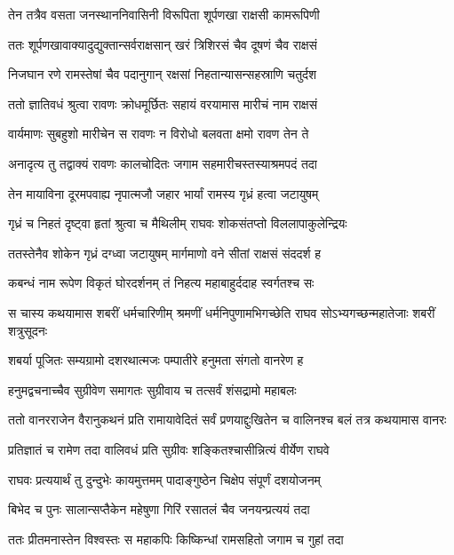 \twolineshloka
{तेन तत्रैव वसता जनस्थाननिवासिनी}
{विरूपिता शूर्पणखा राक्षसी कामरूपिणी} %

\twolineshloka
{ततः शूर्पणखावाक्यादुद्युक्तान्सर्वराक्षसान्}
{खरं त्रिशिरसं चैव दूषणं चैव राक्षसं} %

\twolineshloka
{निजघान रणे रामस्तेषां चैव पदानुगान्}
{रक्षसां निहतान्यासन्सहस्राणि चतुर्दश} %

\twolineshloka
{ततो ज्ञातिवधं श्रुत्वा रावणः क्रोधमूर्छितः}
{सहायं वरयामास मारीचं नाम राक्षसं} %

\twolineshloka
{वार्यमाणः सुबहुशो मारीचेन स रावणः}
{न विरोधो बलवता क्षमो रावण तेन ते} %

\twolineshloka
{अनादृत्य तु तद्वाक्यं रावणः कालचोदितः}
{जगाम सहमारीचस्तस्याश्रमपदं तदा} %

\twolineshloka
{तेन मायाविना दूरमपवाह्य नृपात्मजौ}
{जहार भार्यां रामस्य गृध्रं हत्वा जटायुषम्} %

\twolineshloka
{गृध्रं च निहतं दृष्ट्वा हृतां श्रुत्वा च मैथिलीम्}
{राघवः शोकसंतप्तो विललापाकुलेन्द्रियः} %

\twolineshloka
{ततस्तेनैव शोकेन गृध्रं दग्ध्वा जटायुषम्}
{मार्गमाणो वने सीतां राक्षसं संददर्श ह} %

\twolineshloka
{कबन्धं नाम रूपेण विकृतं घोरदर्शनम्}
{तं निहत्य महाबाहुर्ददाह स्वर्गतश्च सः} %

\threelineshloka
{स चास्य कथयामास शबरीं धर्मचारिणीम्}
{श्रमणीं धर्मनिपुणामभिगच्छेति राघव}
{सोऽभ्यगच्छन्महातेजाः शबरीं शत्रुसूदनः} %

\twolineshloka
{शबर्या पूजितः सम्यग्रामो दशरथात्मजः}
{पम्पातीरे हनुमता संगतो वानरेण ह} %

\twolineshloka
{हनुमद्वचनाच्चैव सुग्रीवेण समागतः}
{सुग्रीवाय च तत्सर्वं शंसद्रामो महाबलः} %

\threelineshloka
{ततो वानरराजेन वैरानुकथनं प्रति}
{रामायावेदितं सर्वं प्रणयाद्दुःखितेन च}
{वालिनश्च बलं तत्र कथयामास वानरः} %

\twolineshloka
{प्रतिज्ञातं च रामेण तदा वालिवधं प्रति}
{सुग्रीवः शङ्कितश्चासीन्नित्यं वीर्येण राघवे} %

\twolineshloka
{राघवः प्रत्ययार्थं तु दुन्दुभेः कायमुत्तमम्}
{पादाङ्गुष्ठेन चिक्षेप संपूर्णं दशयोजनम्} %

\twolineshloka
{बिभेद च पुनः सालान्सप्तैकेन महेषुणा}
{गिरिं रसातलं चैव जनयन्प्रत्ययं तदा} %

\twolineshloka
{ततः प्रीतमनास्तेन विश्वस्तः स महाकपिः}
{किष्किन्धां रामसहितो जगाम च गुहां तदा} %

